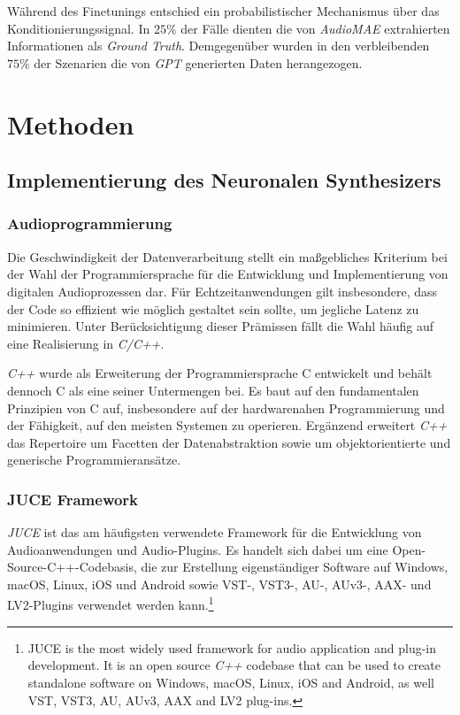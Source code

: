 \documentclass[
  a4paper,  %
  twoside,  %
  bibliography=totoc,
  headsepline,
  cleardoublepage=empty,
  parskip=half,
  draft=false
]{scrbook}
\begin{document}
Während des Finetunings entschied ein probabilistischer Mechanismus über das Konditionierungssignal. In $25\%$ der Fälle dienten die von \emph{AudioMAE} extrahierten Informationen als \emph{Ground Truth}. Demgegenüber wurden in den verbleibenden $75\%$ der Szenarien die von \emph{GPT} generierten Daten herangezogen. \cite{liu_audioldm2_2023}

\chapter{Methoden}
\section{Implementierung des Neuronalen Synthesizers}
\subsection{Audioprogrammierung}
Die Geschwindigkeit der Datenverarbeitung stellt ein maßgebliches Kriterium bei der Wahl der Programmiersprache für die Entwicklung und Implementierung von digitalen Audioprozessen dar. Für Echtzeitanwendungen gilt insbesondere, dass der Code so effizient wie möglich gestaltet sein sollte, um jegliche Latenz zu minimieren. Unter Berücksichtigung dieser Prämissen fällt die Wahl häufig auf eine Realisierung in \emph{C/C++}. \cite{doumler_c_2015, boulanger_audio_2011}

\emph{C++} wurde als Erweiterung der Programmiersprache C entwickelt und behält dennoch C als eine seiner Untermengen bei. Es baut auf den fundamentalen Prinzipien von C auf, insbesondere auf der hardwarenahen Programmierung und der Fähigkeit, auf den meisten Systemen zu operieren. Ergänzend erweitert \emph{C++} das Repertoire um Facetten der Datenabstraktion sowie um objektorientierte und generische Programmieransätze. \cite{stroustrup_c_1997}

\subsection{JUCE Framework}
\glqq\emph{JUCE} ist das am häufigsten verwendete Framework für die Entwicklung von Audioanwendungen und Audio-Plugins. Es handelt sich dabei um eine Open-Source-C++-Codebasis, die zur Erstellung eigenständiger Software auf Windows, macOS, Linux, iOS und Android sowie VST-, VST3-, AU-, AUv3-, AAX- und LV2-Plugins verwendet werden kann.\grqq \footnote{
JUCE is the most widely used framework for audio application and plug-in development. It is an open source \emph{C++} codebase that can be used to create standalone software on Windows, macOS, Linux, iOS and Android, as well VST, VST3, AU, AUv3, AAX and LV2 plug-ins.
} \cite{noauthor_juce_nodate}
\end{document}

